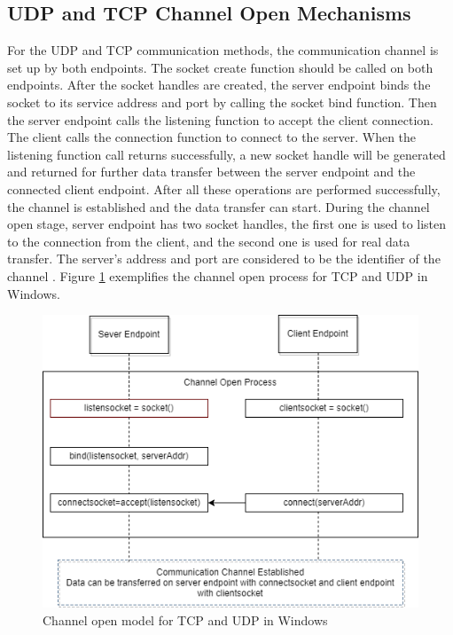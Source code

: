 \documentclass[12pt,oneside]{book}
\begin{document}
\subsection{UDP and TCP Channel Open Mechanisms} 
For the UDP and TCP communication methods, the communication channel is set up by both endpoints. The socket create function should be called on both endpoints. After the socket handles are created, the server endpoint binds the socket to its service address and port by calling the socket bind function. Then the server endpoint calls the listening function to accept the client connection. The client calls the connection function to connect to the server. When the listening function call returns successfully, a new socket handle will be generated and returned for further data transfer between the server endpoint and the connected client endpoint. After all these operations are performed successfully, the channel is established and the data transfer can start. During the channel open stage, server endpoint has two socket handles, the first one is used to listen to the connection from the client, and the second one is used for real data transfer. The server's address and port are considered to be the identifier of the channel \cite{winsock}. Figure \ref{channelopen2} exemplifies the channel open process for TCP and UDP in Windows.

\begin{figure}[H]
\centerline{\includegraphics[scale=0.6]{Figures/tcpudpchannelopen}}
 \caption{Channel open model for TCP and UDP in Windows}
\label{channelopen2}    
\end{figure}
\end{document}
